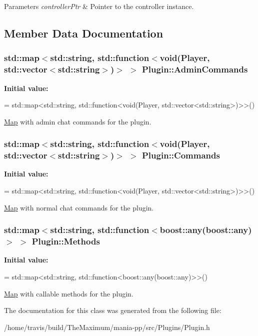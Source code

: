 \begin{DoxyParams}{Parameters}
{\em controller\-Ptr} & Pointer to the controller instance. \\
\hline
\end{DoxyParams}


\subsection{Member Data Documentation}
\hypertarget{classPlugin_a7a1ba3ed5e3c0c23eb1ea2e33cc61c1a}{
\subsubsection[{Admin\-Commands}]{\setlength{\rightskip}{0pt plus 5cm}std\-::map$<$std\-::string, std\-::function$<$void({\bf Player}, std\-::vector$<$std\-::string$>$)$>$ $>$ Plugin\-::\-Admin\-Commands}}\label{classPlugin_a7a1ba3ed5e3c0c23eb1ea2e33cc61c1a}
{\bfseries Initial value\-:}
\begin{DoxyCode}
=
        std::map<std::string, std::function<void(Player, std::vector<std::string>)>>()
\end{DoxyCode}


\hyperlink{structMap}{Map} with admin chat commands for the plugin. 

\hypertarget{classPlugin_a588dcd49b4fe45b3a401b749795b95fe}{
\subsubsection[{Commands}]{\setlength{\rightskip}{0pt plus 5cm}std\-::map$<$std\-::string, std\-::function$<$void({\bf Player}, std\-::vector$<$std\-::string$>$)$>$ $>$ Plugin\-::\-Commands}}\label{classPlugin_a588dcd49b4fe45b3a401b749795b95fe}
{\bfseries Initial value\-:}
\begin{DoxyCode}
=
        std::map<std::string, std::function<void(Player, std::vector<std::string>)>>()
\end{DoxyCode}


\hyperlink{structMap}{Map} with normal chat commands for the plugin. 

\hypertarget{classPlugin_a4a8030e2fa113265d123aa6178c64318}{
\subsubsection[{Methods}]{\setlength{\rightskip}{0pt plus 5cm}std\-::map$<$std\-::string, std\-::function$<$boost\-::any(boost\-::any)$>$ $>$ Plugin\-::\-Methods}}\label{classPlugin_a4a8030e2fa113265d123aa6178c64318}
{\bfseries Initial value\-:}
\begin{DoxyCode}
=
        std::map<std::string, std::function<boost::any(boost::any)>>()
\end{DoxyCode}


\hyperlink{structMap}{Map} with callable methods for the plugin. 



The documentation for this class was generated from the following file\-:\begin{DoxyCompactItemize}
\item 
/home/travis/build/\-The\-Maximum/mania-\/pp/src/\-Plugins/Plugin.\-h\end{DoxyCompactItemize}
